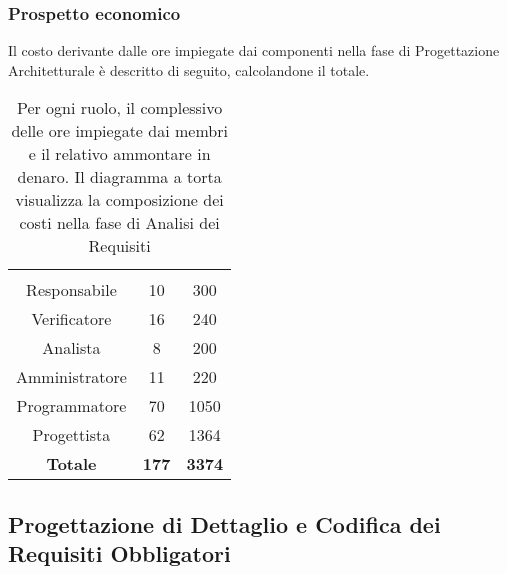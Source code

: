 \subsubsection{Prospetto economico}
Il costo derivante dalle ore impiegate dai componenti nella fase di Progettazione Architetturale è descritto di seguito, calcolandone il totale.

\begin{table}[H]
	{\setlength{\parindent}{0cm}
		\begin{minipage}{.43\textwidth}
			\begin{tabular}{ccc}
				\rowcolorhead
				\headertitle{Ruolo} & \headertitle{Ore} & \headertitle{Costo(€)}\\
				Responsabile & 10 & 300\\
				Verificatore & 16 & 240\\
				Analista & 8 & 200\\
				Amministratore & 11 & 220\\
				Programmatore & 70 & 1050\\
				Progettista & 62 & 1364\\
				\hline
				\textbf{Totale} & \textbf{177} & \textbf{3374}\\
			\end{tabular}
		\end{minipage}%
		\begin{minipage}{.57\textwidth}
	\end{minipage} }
	\caption[Prospetto economico della fase di Analisi dei Requisiti]{Per ogni ruolo, il complessivo delle ore impiegate dai membri e il relativo ammontare in denaro. Il diagramma a torta visualizza la composizione dei costi nella fase di Analisi dei Requisiti}
\end{table}







\subsection{Progettazione di Dettaglio e Codifica dei Requisiti Obbligatori}



